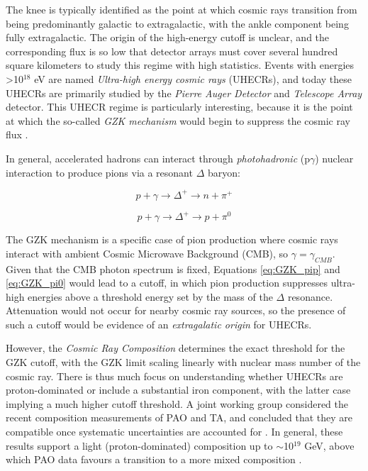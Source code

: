 The knee is typically identified as the point at which cosmic rays transition from being predominantly galactic to extragalactic, with the ankle component being fully extragalactic. The origin of the high-energy cutoff is unclear, and the corresponding flux is so low that detector arrays must cover several hundred square kilometers to study this regime with high statistics. Events with energies >10$^{18}$ eV are named \emph{Ultra-high energy cosmic rays} (UHECRs), and today these UHECRs are primarily studied by the \emph{Pierre Auger Detector} and \emph {Telescope Array} detector. This UHECR regime is particularly interesting, because it is the point at which the so-called \emph{GZK mechanism} would begin to suppress the cosmic ray flux . 

In general, accelerated hadrons can interact through \emph{photohadronic} (p$\gamma$) nuclear interaction to produce pions via a resonant $\Delta$ baryon:

\begin{equation}
	p + \gamma \rightarrow \Delta^{+} \rightarrow n + \pi^{+}
	\label{eq:GZK_pip}
\end{equation}

\begin{equation}
	p + \gamma \rightarrow \Delta^{+} \rightarrow p + \pi^{0}
	\label{eq:GZK_pi0}
\end{equation}

The GZK mechanism is a specific case of pion production where cosmic rays interact with ambient Cosmic Microwave Background (CMB), so $\gamma = \gamma_{CMB}$. Given that the CMB photon spectrum is fixed, Equations \ref{eq:GZK_pip} and \ref{eq:GZK_pi0} would lead to a cutoff, in which pion production suppresses ultra-high energies above a threshold energy set by the mass of the $\Delta$ resonance. Attenuation would not occur for nearby cosmic ray sources, so the presence of such a cutoff would be evidence of an \emph{extragalatic origin} for UHECRs. 

However, the \emph{Cosmic Ray Composition} determines the exact threshold for the GZK cutoff, with the GZK limit scaling linearly with nuclear mass number of the cosmic ray\cite{spurio_18}. There is thus much focus on understanding whether UHECRs are proton-dominated or include a substantial iron component, with the latter case implying a much higher cutoff threshold. A joint working group considered the recent composition measurements of PAO and TA, and concluded that they are compatible once systematic uncertainties are accounted for . In general, these results support a light (proton-dominated) composition up to $\sim$10$^{19}$ GeV, above which PAO data favours a transition to a more mixed composition . 

